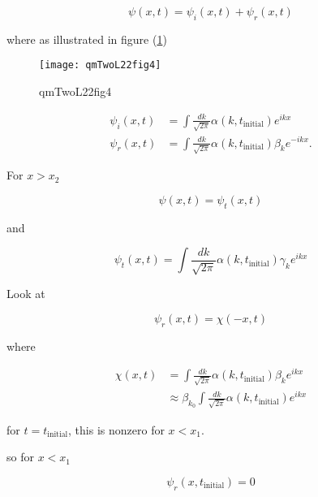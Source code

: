 \begin{equation}\label{eqn:qmTwoL22:190}
\psi(x, t) = \psi_i(x, t) + \psi_r(x, t)
\end{equation}

where as illustrated in figure (\ref{fig:qmTwoL22:qmTwoL22fig4})
\begin{figure}[htp]
   \centering
   \texttt{[image: qmTwoL22fig4]}
   \caption{qmTwoL22fig4}\label{fig:qmTwoL22:qmTwoL22fig4}
\end{figure}

\begin{align}\label{eqn:qmTwoL22:210}
\psi_i(x, t) &= \int \frac{dk}{\sqrt{2 \pi}} \alpha(k, t_{\text{initial}}) e^{i k x} \\
\psi_r(x, t) &= \int \frac{dk}{\sqrt{2 \pi}} \alpha(k, t_{\text{initial}}) \beta_k e^{-i k x}.
\end{align}

For $x > x_2$

\begin{equation}\label{eqn:qmTwoL22:250}
\psi(x, t) = \psi_t(x, t)
\end{equation}

and

\begin{equation}\label{eqn:qmTwoL22:230}
\psi_t(x, t) = \int \frac{dk}{\sqrt{2 \pi}} \alpha(k, t_{\text{initial}}) \gamma_k e^{i k x}
\end{equation}

Look at

\begin{equation}\label{eqn:qmTwoL22:270}
\psi_r(x, t) = \chi(-x, t)
\end{equation}

where

\begin{equation}\label{eqn:qmTwoL22:290}
\begin{aligned}
\chi(x, t)
&= \int \frac{dk}{\sqrt{2 \pi}} \alpha(k, t_{\text{initial}}) \beta_k e^{i k x} \\
&\approx
\beta_{k_0} \int \frac{dk}{\sqrt{2 \pi}} \alpha(k, t_{\text{initial}}) e^{i k x}
\end{aligned}
\end{equation}

for $t = t_{\text{initial}}$, this is nonzero for $x < x_1$.

so for $x < x_1$

\begin{equation}\label{eqn:qmTwoL22:310}
\psi_r(x, t_{\text{initial}}) = 0
\end{equation}

